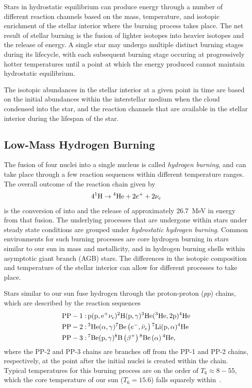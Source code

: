 Stars in hydrostatic equilibrium can produce energy through a number of
different reaction channels based on the mass, temperature, and isotopic
enrichment of the stellar interior where the burning process takes
place. The net result of stellar burning is the fusion of lighter
isotopes into heavier isotopes and the release of energy. A single star
may undergo multiple distinct burning stages during its lifecycle, with
each subsequent burning stage occuring at progressively hotter
temperatures until a point at which the energy produced cannot maintain
hydrostatic equilibrium.

The isotopic abundances in the stellar interior at a given point in time
are based on the initial abundances within the interstellar medium when
the cloud condensed into the star, and the reaction channels that are
available in the stellar interior during the lifespan of the star.

\subsection{Low-Mass Hydrogen Burning}

The fusion of four  nuclei into a single  nucleus
is called \emph{hydrogen burning}, and can take place through a few
reaction sequences within different temperature ranges. The overall
outcome of the reaction chain given by
\[
    4{}^{1}\textrm{H} \rightarrow{} {}^{4}\textrm{He} + 2e^+ + 2\nu_e
\]
is the conversion of  into  and the release of
approximately 26.7~MeV in energy from that fusion. The underlying
processes that are undergone within stars under steady state conditions
are grouped under \emph{hydrostatic hydrogen burning}. Common
environments for such burning processes are core hydrogen burning in
stars similar to our sun in mass and metallicity, and in hydrogen
burning shells within asymptotic giant branch (AGB) stars. The
differences in the isotopic composition and temperature of the stellar
interior can allow for different processes to take place.

Stars similar to our sun fuse hydrogen through the proton-proton ($pp$)
chains, which are described by the reaction sequences
\begin{align*}
    \rm{PP-1:\,}& \rm{p}(\rm{p},e^+\nu_e)
        {}^{2}\textrm{H}(\rm{p},\gamma)
        {}^{3}\textrm{He}({}^{3}\textrm{He},2\rm{p}){}^{4}\textrm{He} \\
    \rm{PP-2:\,}& {}^{3}\textrm{He}(\alpha,\gamma){}^{7}\textrm{Be}
        \left(e^-,\bar{\nu}_e\right){}^{7}\textrm{Li}(\rm{p},\alpha){}^{4}\textrm{He} \\
    \rm{PP-3:\,}& {}^{7}\textrm{Be}(\rm{p},\gamma){}^{8}\textrm{B}
        \left(\beta^+\right){}^{8}\textrm{Be}\left(\alpha\right){}^{4}\textrm{He},
\end{align*}
where the PP-2 and PP-3 chains are branches off from the PP-1 and PP-2
chains, respectively, at the point after the initial nuclei is created
within the chain. Typical temperatures for this burning process are on
the order of $T_6 \approx 8-55$, which the core temperature of our sun
($T_6 = 15.6$) falls squarely within~\cite{Iliadis}.

